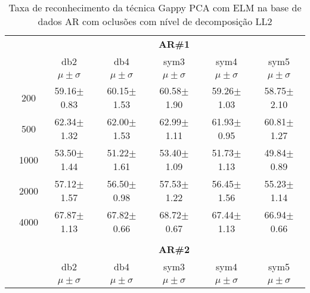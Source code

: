 \begin{table}[H]
\begin{tabular}{|c|c|c c c c c|}
\\\midrule
	\end{tabular}

\end{table} %

\begin{table}[H]
	\centering
    \normalsize
	\caption{Taxa de reconhecimento da técnica Gappy PCA com ELM na base de dados AR com oclusões com nível de decomposição LL2}
	\begin{tabular}{|c|c|c c c c c|}
\cline{3-7}
\multicolumn{2}{c|}{\multirow{3}{*}{}} & \multicolumn{5}{c|}{\textbf{AR\#1}}   \\\cline{3-7} 
\multicolumn{2}{c|}{}  & db2 & db4 & sym3 & sym4 & sym5 \\\cline{3-7}%
\multicolumn{2}{c|}{}& $\mu \pm \sigma$ & $\mu \pm \sigma$ & $\mu \pm \sigma$ & $\mu \pm \sigma$ & $\mu \pm \sigma$ \\\hline


\multicolumn{1}{|c|}{ \multirow{5}{*}{\rotatebox[origin=c]{90}{\textbf{Neurônios}}} }
&200	&59.16$\pm$0.83	&60.15$\pm$1.53	&60.58$\pm$1.90	&59.26$\pm$1.03	&58.75$\pm$2.10\\\cline{2-7}
&500	&62.34$\pm$1.32	&62.00$\pm$1.53	&62.99$\pm$1.11	&61.93$\pm$0.95	&60.81$\pm$1.27\\\cline{2-7}
&1000	&53.50$\pm$1.44	&51.22$\pm$1.61 &53.40$\pm$1.09	&51.73$\pm$1.13	&49.84$\pm$0.89\\\cline{2-7}
&2000	&57.12$\pm$1.57	&56.50$\pm$0.98	&57.53$\pm$1.22	&56.45$\pm$1.56	&55.23$\pm$1.14\\\cline{2-7}
&4000	&67.87$\pm$1.13	&67.82$\pm$0.66	&68.72$\pm$0.67	&67.44$\pm$1.13	&66.94$\pm$0.66



\\\midrule%

\multicolumn{7}{c}{}\\ 

\cline{3-7}
\multicolumn{2}{c|}{\multirow{3}{*}{}} & \multicolumn{5}{c|}{\textbf{AR\#2}}   \\\cline{3-7} 

\multicolumn{2}{c|}{}  & db2 & db4 & sym3 & sym4 & sym5 \\\cline{3-7}
\multicolumn{2}{c|}{}& $\mu \pm \sigma$ & $\mu \pm \sigma$ & $\mu \pm \sigma$ & $\mu \pm \sigma$ & $\mu \pm \sigma$ \\\hline



\end{tabular}
\end{table}
